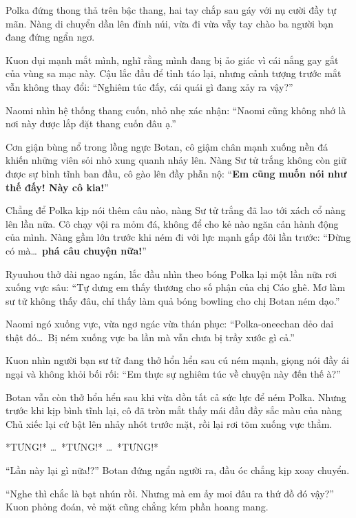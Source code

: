 \documentclass[../main.tex]{subfiles}
\begin{document}
Polka đứng thong thả trên bậc thang, hai tay chắp sau gáy với nụ cười đầy tự mãn. Nàng di chuyển dần lên đỉnh núi, vừa đi vừa vẫy tay chào ba người bạn đang đứng ngẩn ngơ.


Kuon dụi mạnh mắt mình, nghĩ rằng mình đang bị ảo giác vì cái nắng gay gắt của vùng sa mạc này. Cậu lắc đầu để tỉnh táo lại, nhưng cảnh tượng trước mắt vẫn không thay đổi: ``Nghiêm túc đấy, cái quái gì đang xảy ra vậy?''

Naomi nhìn hệ thống thang cuốn, nhỏ nhẹ xác nhận: ``Naomi cũng không nhớ là nơi này được lắp đặt thang cuốn đâu ạ.''

Cơn giận bùng nổ trong lồng ngực Botan, cô giậm chân mạnh xuống nền đá khiến những viên sỏi nhỏ xung quanh nhảy lên. Nàng Sư tử trắng không còn giữ được sự bình tĩnh ban đầu, cô gào lên đầy phẫn nộ: ``\textbf{Em cũng muốn nói như thế đấy! Này cô kia!}''

Chẳng để Polka kịp nói thêm câu nào, nàng Sư tử trắng đã lao tới xách cổ nàng lên lần nữa. Cô chạy vội ra mỏm đá, không để cho kẻ nào ngăn cản hành động của mình. Nàng gầm lớn trước khi ném đi với lực mạnh gấp đôi lần trước: ``Đừng có mà\dots\ \textbf{phá câu chuyện nữa!}''

Ryuuhou thở dài ngao ngán, lắc đầu nhìn theo bóng Polka lại một lần nữa rơi xuống vực sâu: ``Tự dưng em thấy thương cho số phận của chị Cáo ghê. Mơ làm sư tử không thấy đâu, chỉ thấy làm quả bóng bowling cho chị Botan ném dạo.''

Naomi ngó xuống vực, vừa ngơ ngác vừa thán phục: ``Polka-oneechan dẻo dai thật đó\dots\ Bị ném xuống vực ba lần mà vẫn chưa bị trầy xước gì cả.''

Kuon nhìn người bạn sư tử đang thở hổn hển sau cú ném mạnh, giọng nói đầy ái ngại và không khỏi bối rối: ``Em thực sự nghiêm túc về chuyện này đến thế à?''

Botan vẫn còn thở hổn hển sau khi vừa dồn tất cả sức lực để ném Polka. Nhưng trước khi kịp bình tĩnh lại, cô đã tròn mắt thấy mái đầu đầy sắc màu của nàng Chủ xiếc lại cứ bật lên nhảy nhót trước mặt, rồi lại rơi tõm xuống vực thẳm.


*TƯNG!* \dots\ *TƯNG!* \dots\ *TƯNG!*

``Lần này lại gì nữa!?'' Botan đứng ngẩn người ra, đầu óc chẳng kịp xoay chuyển.

``Nghe thì chắc là bạt nhún rồi. Nhưng mà em ấy moi đâu ra thứ đồ đó vậy?'' Kuon phỏng đoán, vẻ mặt cũng chẳng kém phần hoang mang.
\end{document}
